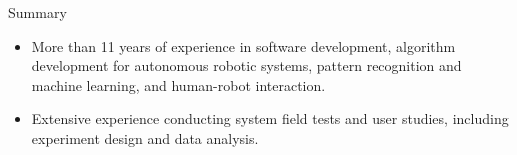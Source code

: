 \documentclass{resume} %
\begin{document}
%



\iffalse
\begin{rSection}{Objective}

  Searching for a part-time software developer position.

\end{rSection}
\fi



\iffalse
\begin{rSection}{Research Interests}

  Autonomous robotic systems, systems and controls, healthcare robotics,
  assistive technology, human-robot interaction, pattern recognition, and
  machine learning.

\end{rSection}
\fi




\begin{rSection}{Summary}

\begin{itemize}
\item More than 11 years of experience in software development, algorithm
  development for autonomous robotic systems, pattern recognition and machine
  learning, and human-robot interaction.
\item Extensive experience conducting system field tests and user studies,
  including experiment design and data analysis.
\end{itemize}

\end{rSection}
\end{document}
